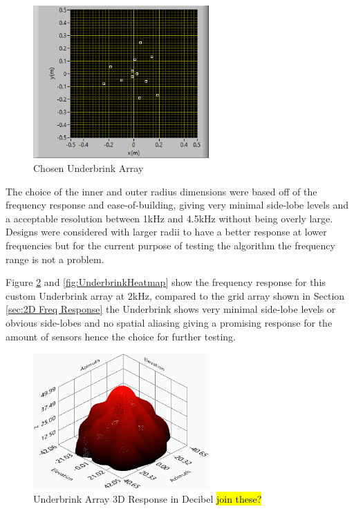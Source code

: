 \documentclass{UoNMCHA}
\numberwithin{equation}{section}
\begin{document}
    \begin{figure} [H]
        \centering
        \includegraphics[keepaspectratio, width = 0.6\textwidth]{Figures/CurrentTestingArray.png}
        \caption{Chosen Underbrink Array}
        \label{fig:Testing Array}
    \end{figure}
    
    The choice of the inner and outer radius dimensions were based off of the frequency response and ease-of-building, giving very minimal side-lobe levels and a acceptable resolution between 1kHz and 4.5kHz without being overly large. Designs were considered with larger radii to have a better response at lower frequencies but for the current purpose of testing the algorithm the frequency range is not a problem.
    
    Figure \ref{fig:UnderbrinkdB} and \ref{fig:UnderbrinkHeatmap} show the frequency response for this custom Underbrink array at 2kHz, compared to the grid array shown in Section \ref{sec:2D Freq Response} the Underbrink shows very minimal side-lobe levels or obvious side-lobes and no spatial aliasing giving a promising response for the amount of sensors hence the choice for further testing.  
    
    \begin{figure} [H]
        \centering
        \includegraphics[keepaspectratio, width = 0.6\textwidth]{Figures/3DdB12mm.png}
        \caption{Underbrink Array 3D Response in Decibel \hl{join these?}}
        \label{fig:UnderbrinkdB}
    \end{figure}
    
\end{document}

